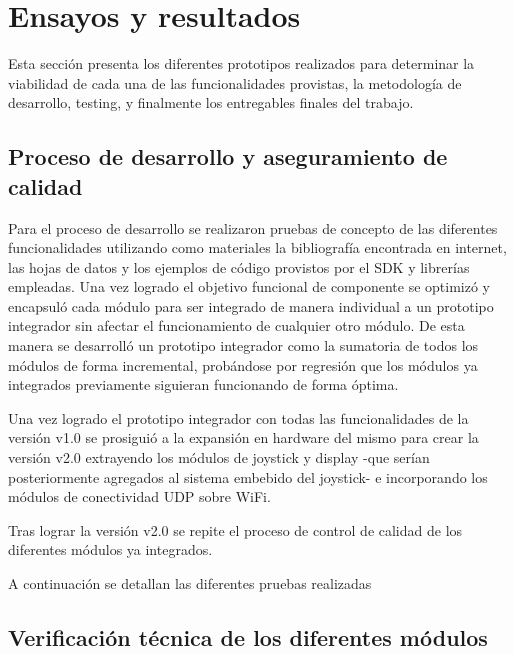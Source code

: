 
\chapter{Ensayos y resultados} %

\label{Chapter4} %

Esta sección presenta los diferentes prototipos realizados para determinar la viabilidad de cada una de las funcionalidades provistas, la metodología de desarrollo, testing, y finalmente los entregables finales del trabajo.

\section{Proceso de desarrollo y aseguramiento de calidad}
\label{sec:pruebasHW}

Para el proceso de desarrollo se realizaron pruebas de concepto de las diferentes funcionalidades utilizando como materiales la bibliografía encontrada en internet, las hojas de datos y los ejemplos de código provistos por el SDK y librerías empleadas. Una vez logrado el objetivo funcional de componente se optimizó y encapsuló cada módulo para ser integrado de manera individual a un prototipo integrador sin afectar el funcionamiento de cualquier otro módulo.
De esta manera se desarrolló un prototipo integrador como la sumatoria de todos los módulos de forma incremental, probándose por regresión que los módulos ya integrados previamente siguieran funcionando de forma óptima.

Una vez logrado el prototipo integrador con todas las funcionalidades de la versión v1.0 se prosiguió a la expansión en hardware del mismo para crear la versión v2.0 extrayendo los módulos de joystick y display -que serían posteriormente agregados al sistema embebido del joystick- e incorporando los módulos de conectividad UDP sobre WiFi.

Tras lograr la versión v2.0 se repite el proceso de control de calidad de los diferentes módulos ya integrados.

A continuación se detallan las diferentes pruebas realizadas

\section{Verificación técnica de los diferentes módulos}


